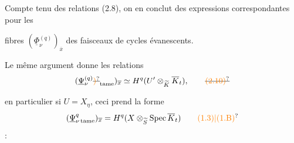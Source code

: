 
Compte tenu des  relations (2.8), on  en conclut des expressions correspondantes pour les



fibres $(\underline\Phi_\nu^{(q)})_{\overline x}$ des faisceaux de cycles évanescents.

 Le même argument donne les relations
\[
(\underline\Psi_\nu^{(q)}\deleted{\unsure{)}}_{\mathrm{tame}})_{\overline x}\simeq H^q(U'\otimes_{\widetilde K}\overline K_t),
\tag*{\deleted{\unsure{(2.10)}}}
\]

en particulier si $U=X_\eta$, ceci  prend la forme
\[
(\underline\Psi_{\nu\,\mathrm{tame}}^q)_{\overline x}=H^q(X\otimes_{\widetilde S}\operatorname{Spec}\overline K_t)
\tag*{\unsure{(1.3)|(1.B)}}
\]
 :


